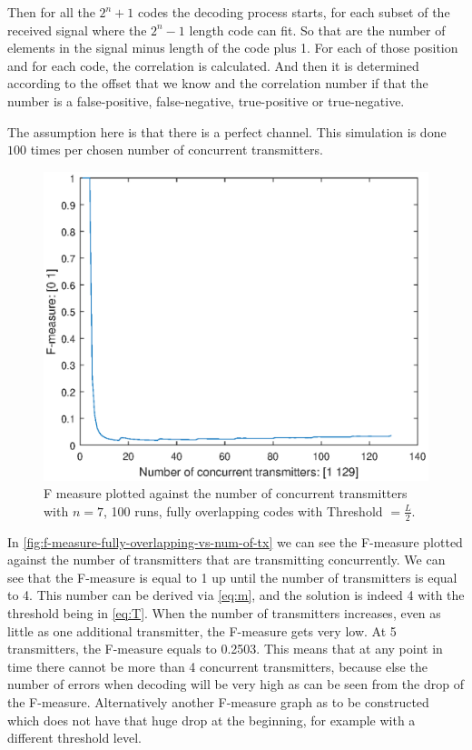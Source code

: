		Then for all the $2^n +1$ codes the decoding process starts, for each subset of the received signal where the $2^n - 1$ length code can fit.
		So that are the number of elements in the signal minus length of the code plus 1.
		For each of those position and for each code, the correlation is calculated.
		And then it is determined according to the offset that we know and the correlation number if that the number is a false-positive, false-negative, true-positive or true-negative.

		The assumption here is that there is a perfect channel.
		This simulation is done $100$ times per chosen number of concurrent transmitters.





		\begin{figure}
			\centering
			\includegraphics[width=\textwidth]{chapters/f-measure-n=7-full-overlap-radio-a=1-100runs.eps}
			\caption{F measure plotted against the number of concurrent transmitters with $n = 7$, 100 runs, fully overlapping codes with Threshold $= \frac{L}{2}$.}
			\label{fig:f-measure-fully-overlapping-vs-num-of-tx}
		\end{figure}

		In \autoref{fig:f-measure-fully-overlapping-vs-num-of-tx} we can see the F-measure plotted against the number of transmitters that are transmitting concurrently.
		We can see that the F-measure is equal to 1 up until the number of transmitters is equal to 4.
		This number can be derived via \autoref{eq:m}, and the solution is indeed 4 with the threshold being in \autoref{eq:T}.
		When the number of transmitters increases, even as little as one additional transmitter, the F-measure gets very low. 
		At 5 transmitters, the F-measure equals to 0.2503. 
		This means that at any point in time there cannot be more than 4 concurrent transmitters, because else the number of errors when decoding will be very high as can be seen from the drop of the F-measure.
		Alternatively another F-measure graph as to be constructed which does not have that huge drop at the beginning, for example with a different threshold level.



